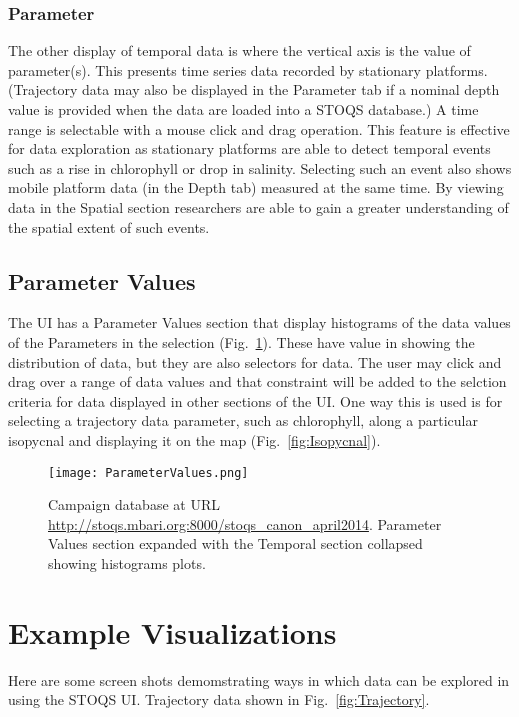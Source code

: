 \documentclass[conference]{IEEEtran}
\begin{document}
\subsubsection{Parameter}
The other display of temporal data is where the vertical axis is the value of 
parameter(s). This presents time series data recorded by stationary platforms. 
(Trajectory data may also be displayed in the Parameter tab if a nominal
depth value is provided when the data are loaded into a STOQS database.)
A time range is selectable with a mouse click and drag operation. This 
feature is effective for data exploration as stationary platforms are able 
to detect temporal events such as a rise in chlorophyll or drop in salinity. 
Selecting such an event also shows mobile platform data (in the Depth tab) 
measured at the same time. By viewing data in the Spatial section 
researchers are able to gain a greater understanding of the spatial 
extent of such events.

\subsection{Parameter Values}

The UI has a Parameter Values section that display histograms of the data values
of the Parameters in the selection (Fig.~\ref{fig:ParameterValues}). These have value 
in showing the distribution
of data, but they are also selectors for data. The user may click and drag over
a range of data values and that constraint will be added to the selction criteria
for data displayed in other sections of the UI. One way this is used is for 
selecting a trajectory data parameter, such as chlorophyll, along a particular 
isopycnal and displaying it on the map (Fig.~\ref{fig:Isopycnal}).


\begin{figure}[htbp]
\centering
\texttt{[image: ParameterValues.png]}
\caption{Campaign database at URL \url{http://stoqs.mbari.org:8000/stoqs_canon_april2014}. 
Parameter Values section expanded with the Temporal section collapsed 
showing histograms plots.}
\label{fig:ParameterValues}
\end{figure}


\section{Example Visualizations}

Here are some screen shots demomstrating ways in which data can be explored in using the STOQS UI.
Trajectory data shown in Fig.~\ref{fig:Trajectory}.
\end{document}
